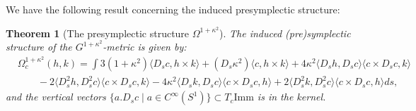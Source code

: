 \documentclass[12pt]{amsart}
\newtheorem{theorem}{Theorem}[section]
\theoremstyle{definition}
\newcommand{\Imm}{\mathrm{Imm}}
\def\ka{\kappa}
\def\Om{\Omega}
\def\x{\times}
\begin{document}
We have the following result concerning the induced presymplectic structure: 
\begin{theorem}[The presymplectic structure $\Om^{1+\ka^2}$]\label{kappa-non-deg}
The induced (pre)symplectic structure of the $G^{1+\ka^2}$-metric is given by:
\begin{equation}\label{eq:Om_ka}
\begin{aligned} 
&\Om^{1+\ka^2}_c(h,k)
      =\int 3(1+\ka^2) \langle D_s c, h \x k\rangle +(D_s \ka^2) \langle c,h \x k\rangle+
4 \ka^2\langle D_sh,D_sc\rangle\langle c\x D_s c, k \rangle\\&\qquad-2\langle D_s^2h, D_s^2c\rangle\langle c\x D_s c, k \rangle
    -4 \ka^2\langle D_sk,D_sc\rangle\langle c\x D_s c,h\rangle + 2\langle D_s^2k, D_s^2c\rangle\langle c\x D_s c,h\rangle ds,
\end{aligned}
\end{equation}
and  the vertical vectors $\{a.D_s c \mid a\in C^\infty(S^1)\}\subset T_c \Imm$ is in the kernel.


\end{theorem}
\end{document}
